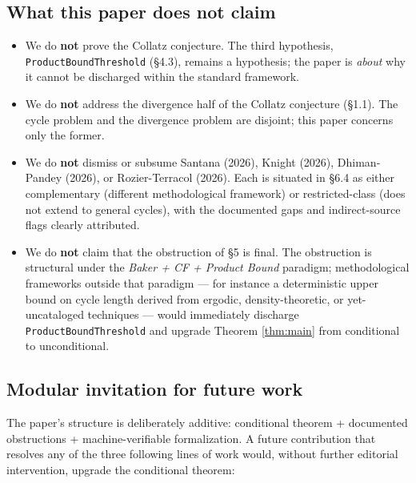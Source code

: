 \documentclass[
  11pt]{amsart}
\theoremstyle{plain}
\theoremstyle{definition}
\theoremstyle{remark}
\begin{document}
\subsection{What this paper does not
claim}\label{what-this-paper-does-not-claim}

\begin{itemize}
\item
  We do \textbf{not} prove the Collatz conjecture. The third hypothesis,
  \texttt{ProductBoundThreshold} (§4.3), remains a hypothesis; the paper
  is \emph{about} why it cannot be discharged within the standard
  framework.
\item
  We do \textbf{not} address the divergence half of the Collatz
  conjecture (§1.1). The cycle problem and the divergence problem are
  disjoint; this paper concerns only the former.
\item
  We do \textbf{not} dismiss or subsume Santana (2026), Knight (2026),
  Dhiman-Pandey (2026), or Rozier-Terracol (2026). Each is situated in
  §6.4 as either complementary (different methodological framework) or
  restricted-class (does not extend to general cycles), with the
  documented gaps and indirect-source flags clearly attributed.
\item
  We do \textbf{not} claim that the obstruction of §5 is final. The
  obstruction is structural under the \emph{Baker + CF + Product Bound}
  paradigm; methodological frameworks outside that paradigm --- for
  instance a deterministic upper bound on cycle length derived from
  ergodic, density-theoretic, or yet-uncataloged techniques --- would
  immediately discharge \texttt{ProductBoundThreshold} and upgrade
  Theorem \ref{thm:main} from conditional to unconditional.
\end{itemize}

\subsection{Modular invitation for future
work}\label{modular-invitation-for-future-work}

The paper's structure is deliberately additive: conditional theorem +
documented obstructions + machine-verifiable formalization. A future
contribution that resolves any of the three following lines of work
would, without further editorial intervention, upgrade the conditional
theorem:
\end{document}
